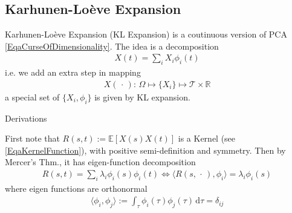 





\subsection{Karhunen-Loève Expansion}

Karhunen-Loève Expansion (KL Expansion) is a coutinuous version of PCA \autoref{EqaCurseOfDimensionality}. The idea is a decomposition 
\begin{align}
    X(t)=\sum_{i}X_i\phi _i(t) 
\end{align}
i.e. we add an extra step in mapping
\begin{align}
    X(\, \cdot \, ):\, \Omega\mapsto \{X_i\}\mapsto \mathcal{T}\times \mathbb{R}  
\end{align}
a special set of $ \{X_i,\phi_i\} $ is given by KL expansion.

\begin{point}
    Derivations
\end{point}

First note that $ R(s,t):=\mathbb{E}\left[ X(s)X(t) \right] $ is a Kernel (see \autoref{EqaKernelFunction}), with positive semi-definition and symmetry. Then by Mercer's Thm., it has eigen-function decomposition
\begin{align}
    R(s,t) =\sum_{i} \lambda _i\phi _i(s)\phi _i(t) \Leftrightarrow \langle R(s,\, \cdot \, ),\phi_i\rangle = \lambda _i\phi_i(s)
\end{align}
where eigen functions are orthonormal
\begin{align}
    \langle \phi _i, \phi _j \rangle := \int_\tau \phi _i(\tau)\phi _j(\tau)\,\mathrm{d}\tau = \delta _{ij}
\end{align}

